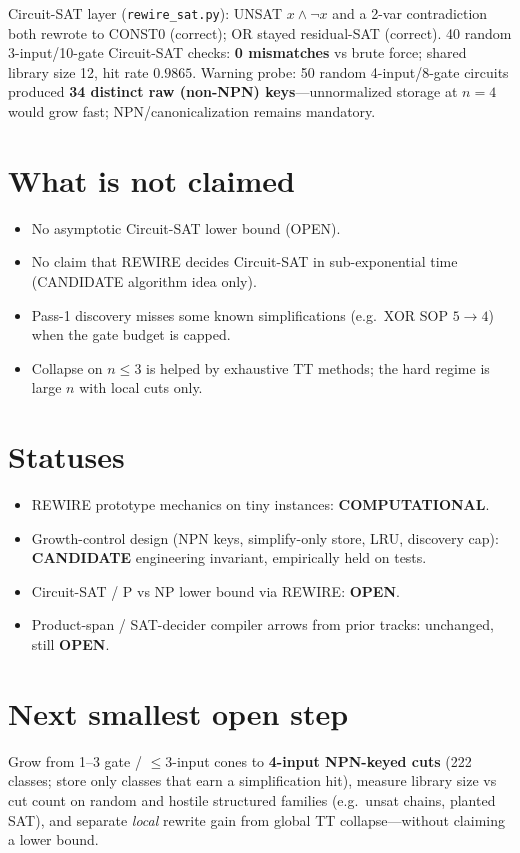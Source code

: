\documentclass[11pt]{article}
\begin{document}
Circuit-SAT layer (\texttt{rewire\_sat.py}): UNSAT $x\land\neg x$ and a 2-var contradiction both rewrote to CONST0 (correct); OR stayed residual-SAT (correct). 40 random 3-input/10-gate Circuit-SAT checks: \textbf{0 mismatches} vs brute force; shared library size 12, hit rate $0.9865$. Warning probe: 50 random 4-input/8-gate circuits produced \textbf{34 distinct raw (non-NPN) keys}---unnormalized storage at $n{=}4$ would grow fast; NPN/canonicalization remains mandatory.

\section{What is not claimed}
\begin{itemize}
\item No asymptotic Circuit-SAT lower bound (OPEN).
\item No claim that REWIRE decides Circuit-SAT in sub-exponential time (CANDIDATE algorithm idea only).
\item Pass-1 discovery misses some known simplifications (e.g.\ XOR SOP $5\to 4$) when the gate budget is capped.
\item Collapse on $n\le 3$ is helped by exhaustive TT methods; the hard regime is large $n$ with local cuts only.
\end{itemize}

\section{Statuses}
\begin{itemize}
\item REWIRE prototype mechanics on tiny instances: \textbf{COMPUTATIONAL}.
\item Growth-control design (NPN keys, simplify-only store, LRU, discovery cap): \textbf{CANDIDATE} engineering invariant, empirically held on tests.
\item Circuit-SAT / P vs NP lower bound via REWIRE: \textbf{OPEN}.
\item Product-span / SAT-decider compiler arrows from prior tracks: unchanged, still \textbf{OPEN}.
\end{itemize}

\section{Next smallest open step}
Grow from 1--3 gate / $\le 3$-input cones to \textbf{4-input NPN-keyed cuts} (222 classes; store only classes that earn a simplification hit), measure library size vs cut count on random and hostile structured families (e.g.\ unsat chains, planted SAT), and separate \emph{local} rewrite gain from global TT collapse---without claiming a lower bound.

\end{document}
